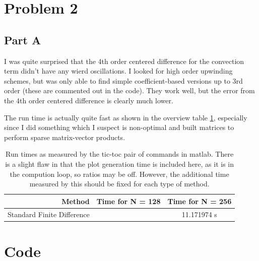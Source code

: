 \documentclass{article}
\begin{document}
\section{Problem 2}
\subsection{Part A}
I was quite surprised that the 4th order centered difference for the convection term didn't have any wierd oscillations.
I looked for high order upwinding schemes, but was only able to find simple coefficient-based versions up to 3rd order (these are commented out in the code).
They work well, but the error from the 4th order centered difference is clearly much lower.

The run time is actually quite fast as shown in the overview table \ref{tbl:runtime}, especially since I did something which I suspect is non-optimal and built matrices to perform sparse matrix-vector products.

\begin{table}[!ht]
\centering
\caption{Run times as measured by the tic-toc pair of commands in matlab. There is a slight flaw in that the plot generation time is included here, as it is in the compution loop, so ratios may be off. However, the additional time measured by this should be fixed for each type of method.}
\label{tbl:runtime}
\begin{tabular}{r | c c}
Method & Time for N = 128 & Time for N = 256 \\
\midrule
Standard Finite Difference & & 11.171974 s
\end{tabular}
\end{table}

\clearpage
\appendix
\section{Code}

\end{document}
